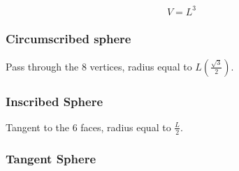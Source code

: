 \[
  V=L^3 
\]

\subsubsection{Circumscribed sphere}

Pass through the $8$ vertices, radius equal to $L(\frac{\sqrt{3}}{2})$.


%
%
%

\subsubsection{Inscribed Sphere}

Tangent to the $6$ faces, radius equal to $\frac{L}{2}$.

%
%
%
%

\subsubsection{Tangent Sphere}

